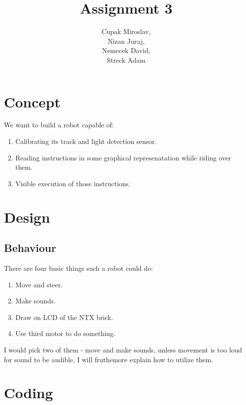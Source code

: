 \documentclass{article}
\title{Assignment 3}
\begin{document}
\author{Cupak Miroslav,\\
		Nizan Juraj, \\
        Nemecek David,\\
		Streck Adam}
\maketitle

\section{Concept}
We want to build a robot capable of:
\begin {enumerate}
\item Calibrating its track and light detection sensor.
\item Reading instructions in some graphical represenatation while riding over them.
\item Visible execution of those instructions.
\end {enumerate}

\section{Design}

\subsection{Behaviour}
There are four basic things such a robot could do:
\begin{enumerate}
\item Move and steer.
\item Make sounds.
\item Draw on LCD of the NTX brick.
\item Use third motor to do something.
\end{enumerate}
I would pick two of them - move and make sounds, unless movement is too loud for sound to be audible, I will fruthemore explain how to utilize them.







\section{Coding}










\end{document}
